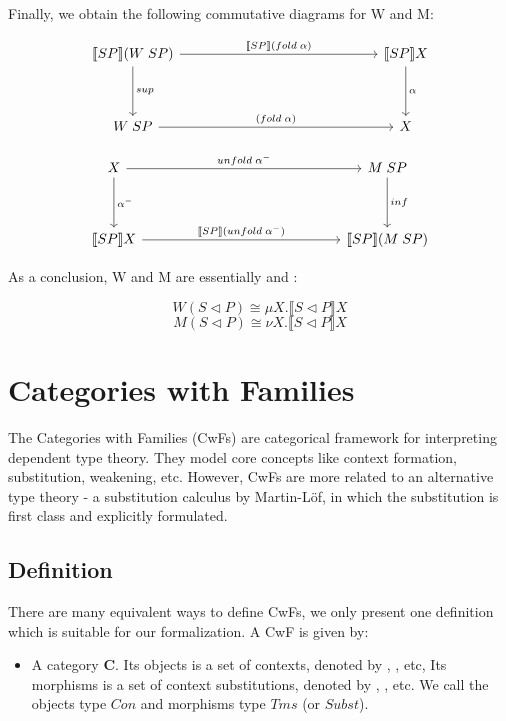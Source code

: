 {Finally, we obtain the following commutative diagrams for W and M:

\[
\begin{tikzcd}[row sep=huge, column sep=5.0cm]
\llbracket SP \rrbracket (W\;SP) \arrow[r, "\llbracket SP \rrbracket (fold\;\alpha)"] \arrow[d, "sup"]
& \llbracket SP \rrbracket X \arrow[d, "\alpha"] \\
W\;SP \arrow[r, "(fold\;\alpha)"]
& X
\end{tikzcd}
\]

\[
\begin{tikzcd}[row sep=huge, column sep=5.0cm]
X \arrow[r, "unfold\;\alpha^{-}"] \arrow[d, "\alpha^{-}"]
& M\;SP \arrow[d, "inf"] \\
\llbracket SP \rrbracket X \arrow[r, "\llbracket SP \rrbracket (unfold\;\alpha^{-})"]
& \llbracket SP \rrbracket (M\;SP)
\end{tikzcd}
\]

As a conclusion, W and M are essentially \mu and \nu:

\[ W(S \triangleleft P) \cong \mu X. \llbracket S \triangleleft P \rrbracket X \]
\[ M(S \triangleleft P) \cong \nu X. \llbracket S \triangleleft P \rrbracket X \]

\section{Categories with Families}

The Categories with Families (CwFs) are categorical framework for interpreting dependent type theory. They model core concepts like context formation, substitution, weakening, etc. However, CwFs are more related to an alternative type theory - a substitution calculus by Martin-Löf, in which the substitution is first class and explicitly formulated.

\subsection{Definition}

There are many equivalent ways to define CwFs, we only present one definition which is suitable for our formalization. A CwF is given by:

\begin{itemize}
  \item{A category \textbf{C}. Its objects is a set of contexts, denoted by \Gamma, \Delta, etc, Its morphisms is a set of context substitutions, denoted by \gamma, \delta, etc. We call the objects type $Con$ and morphisms type $Tms$ (or $Subst$).
  
}
\end{itemize}}
